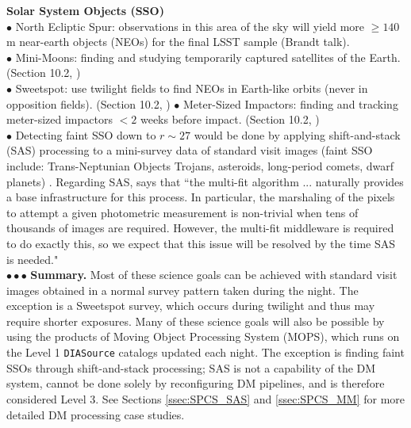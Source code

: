 \documentclass[DM,lsstdraft,toc]{lsstdoc}
\begin{document}
\medskip
\noindent \textbf{Solar System Objects (SSO)}\\
$\bullet$ North Ecliptic Spur: observations in this area of the sky will yield more $\geq140$ m near-earth objects (NEOs) for the final LSST sample (Brandt talk). \\
$\bullet$ Mini-Moons: finding and studying temporarily captured satellites of the Earth. (Section 10.2, \cite{2017arXiv170804058L}) \\
$\bullet$ Sweetspot: use twilight fields to find NEOs in Earth-like orbits (never in opposition fields). (Section 10.2, \cite{2017arXiv170804058L}) 
$\bullet$ Meter-Sized Impactors: finding and tracking meter-sized impactors $<2$ weeks before impact.  (Section 10.2, \cite{2017arXiv170804058L}) \\
$\bullet$ Detecting faint SSO down to $r\sim27$ would be done by applying shift-and-stack (SAS) processing to a mini-survey data of standard visit images (faint SSO include: Trans-Neptunian Objects Trojans, asteroids, long-period comets, dwarf planets) \citep{BeckerWP}. Regarding SAS, \cite{BeckerWP} says that ``the multi-fit algorithm ... naturally provides a base infrastructure for this process. In particular, the marshaling of the pixels to attempt a given photometric measurement is non-trivial when tens of thousands of images are required. However, the multi-fit middleware is required to do exactly this, so we expect that this issue will be resolved by the time SAS is needed." \\
$\bullet \bullet \bullet$ {\bf Summary.} Most of these science goals can be achieved with standard visit images obtained in a normal survey pattern taken during the night. The exception is a Sweetspot survey, which occurs during twilight and thus may require shorter exposures. Many of these science goals will also be possible by using the products of Moving Object Processing System (MOPS), which runs on the Level 1 {\tt DIASource} catalogs updated each night. The exception is finding faint SSOs through shift-and-stack processing; SAS is not a capability of the DM system, cannot be done solely by reconfiguring DM pipelines, and is therefore considered Level 3. See Sections \ref{ssec:SPCS_SAS} and \ref{ssec:SPCS_MM} for more detailed DM processing case studies.
\end{document}
